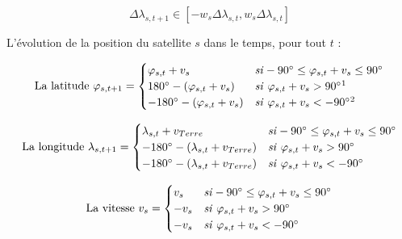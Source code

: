 \documentclass[11pt, oneside]{article}   	%
\begin{document}
\begin{equation}
\Delta\lambda_{s, t+1} \in [-w_s\Delta\lambda_{s, t}, w_s\Delta\lambda_{s, t}]
\label{max-speed-lambda}
\end{equation}

L'évolution de la position du satellite $s$ dans le temps, pour tout $t$ :

\begin{equation}
\begin{displaystyle}
\text{La latitude } \varphi_{s, t+1} =
	\begin{cases}
		\varphi_{s, t} + v_s & \mathit{si} -90\degree \leq \varphi_{s, t} + v_s \leq 90\degree \\
		180\degree - (\varphi_{s, t} + v_s) & \mathit{si} \ \varphi_{s, t} + v_s > 90\degree \footnotemark \\
		-180\degree - (\varphi_{s, t} + v_s) & \mathit{si} \ \varphi_{s, t} + v_s < -90\degree \footnotemark \\
	\end{cases}
\end{displaystyle}
\end{equation}

\addtocounter{footnote}{-1}

\begin{equation}
\begin{displaystyle}
\text{La longitude }\lambda_{s, t+1} =
	\begin{cases}
		\lambda_{s, t} + v_{Terre} & \mathit{si} -90\degree \leq \varphi_{s, t} + v_s \leq 90\degree \\
		-180\degree - (\lambda_{s, t} + v_{Terre}) & \mathit{si} \ \varphi_{s, t} + v_s > 90\degree \\
		-180\degree - (\lambda_{s, t} + v_{Terre}) & \mathit{si} \ \varphi_{s, t} + v_s < -90\degree
	\end{cases}
\end{displaystyle}
\end{equation}

\begin{equation}
\begin{displaystyle}
\text{La vitesse } v_s =
	\begin{cases}
		v_s & \mathit{si} -90\degree \leq \varphi_{s, t} + v_s \leq 90\degree \\
		-v_s & \mathit{si} \ \varphi_{s, t} + v_s > 90\degree \\
		-v_s & \mathit{si} \ \varphi_{s, t} + v_s < -90\degree
	\end{cases}
\end{displaystyle}
\end{equation}
\end{document}
